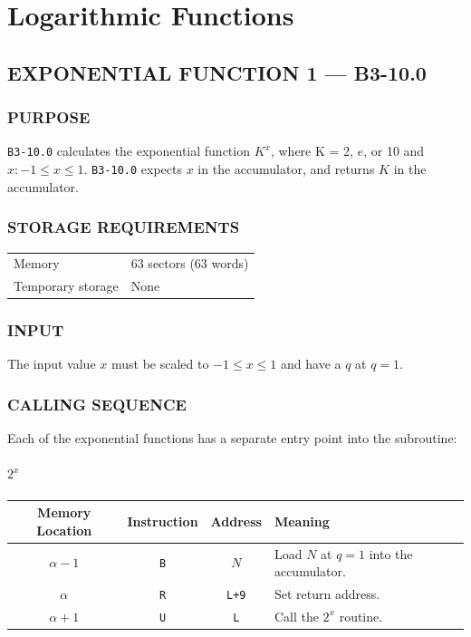 \section{Logarithmic Functions}
\subsection*{EXPONENTIAL FUNCTION 1 --- B3-10.0}
\label{sec:exponential_function_1}

\subsubsection*{PURPOSE}
\texttt{B3-10.0} calculates the exponential function $K^x$, where K = 2, $e$, or 10 and $x: -1 \le x \le 1$. \texttt{B3-10.0} expects $x$ in the accumulator, and returns $K$ in the accumulator.

\subsubsection*{STORAGE REQUIREMENTS}
\begin{center}
\begin{tabular}{ll}
    \toprule
    Memory & 63 sectors (63 words) \\
    Temporary storage & None \\
    \bottomrule
\end{tabular}
\end{center}

\subsubsection*{INPUT}
The input value $x$ must be scaled to $-1 \le x \le 1$ and have a $q$ at $q=1$.

\subsubsection*{CALLING SEQUENCE}
Each of the exponential functions has a separate entry point into the subroutine:

\paragraph{$2^x$}
\begin{center}
\begin{tabularx}{\textwidth}{cccX}
\toprule
\textbf{Memory Location} & \textbf{Instruction} & \textbf{Address} & \textbf{Meaning} \\
\midrule
$\alpha-1$ & \texttt{B} & $N$ & Load $N$ at $q=1$ into the accumulator. \\
$\alpha$ & \texttt{R} & \texttt{L+9} & Set return address. \\
$\alpha+1$ & \texttt{U} & \texttt{L} & Call the $2^x$ routine. \\
\bottomrule
\end{tabularx}
\end{center}

